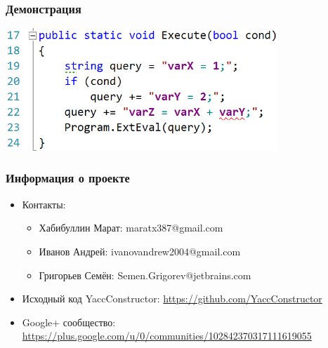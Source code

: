 \documentclass{beamer}
\begin{document}
\begin{frame}[fragile]
	\transwipe[direction=90]
	\frametitle{Демонстрация}
	\begin{center}
            \includegraphics[width=290pt]{pictures/Undefined_variable.PNG}
        \end{center}
\end{frame}

\begin{frame}
	\transwipe[direction=90]
	\frametitle{Информация о проекте}
	\begin{itemize}
		\item Контакты: 
        \begin{itemize}
	 \item Хабибуллин Марат: maratx387@gmail.com
            \item Иванов Андрей: ivanovandrew2004@gmail.com
            \item Григорьев Семён: Semen.Grigorev@jetbrains.com
        \end{itemize}
		\item Исходный код YaccConstructor: \href{https://github.com/YaccConstructor}{https://github.com/YaccConstructor}		
		\item Google+ сообщество: \href{https://plus.google.com/u/0/communities/102842370317111619055}{https://plus.google.com/u/0/communities/102842370317111619055}
	\end{itemize}
\end{frame}
\end{document}
